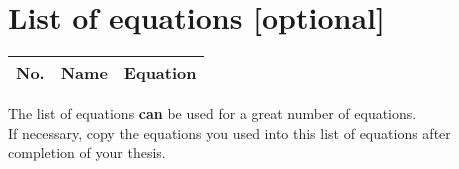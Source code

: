 \chapter{List of equations [optional]}
\label{sec: ListOfEquations}

\begin{table}[h]
	\centering
	\begin{tabular}{|M{0.8cm}|m{2.8cm}|m{10.8cm}|}
		\hline
		\textbf{No.} & \textbf{Name} & \textbf{Equation} \\
		\hline
		\hline
	\end{tabular}
\end{table}
\noindent The list of equations \textbf{can} be used for a great number of equations.
\vspace{6pt}\\
If necessary, copy the equations you used into this list of equations after completion of your thesis.

